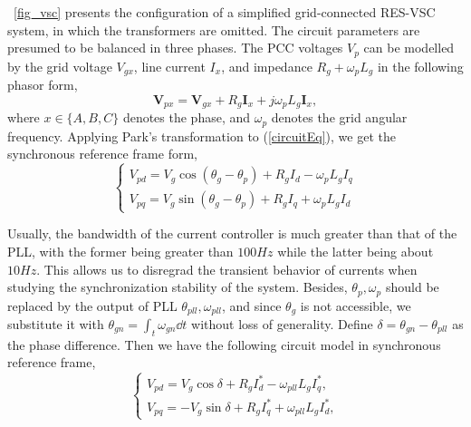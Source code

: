 \documentclass[10pt,final,journal,twoside]{IEEEtran}
\begin{document}
\figurename~\ref{fig_vsc} presents the configuration of a simplified grid-connected RES-VSC system, in which the transformers are omitted. The circuit parameters are presumed to be balanced in three phases.
The PCC voltages $V_p$ can be modelled by the grid voltage $V_{gx}$, line current $I_x$, and impedance $R_g+\omega_pL_g$ in the following phasor form,
\begin{equation}\label{circuitEq}
\bm{V}_{px}=\bm{V}_{gx}+R_g\bm{I}_x+j\omega_pL_g\bm{I}_x,
\end{equation}
where $x\in\{A,B,C\}$ denotes the phase, and $\omega_p$ denotes the grid angular frequency. Applying Park's transformation to (\ref{circuitEq}), we get the synchronous reference frame form,
\begin{equation}\label{circuitdqEq1}
\begin{cases}
    V_{pd}=V_g\cos\left(\theta_g-\theta_p\right)+R_gI_d-\omega_pL_gI_q\\
    V_{pq}=V_g\sin\left(\theta_g-\theta_p\right)+R_gI_q+\omega_pL_gI_d
\end{cases}
\end{equation}\par
Usually, the bandwidth of the current controller is much greater than that of the PLL, with the former being greater than $100Hz$\cite{morris2021} while the latter being about $10Hz$\cite{hu2017}.
This allows us to disregrad the transient behavior of currents when studying the synchronization stability of the system. Besides, $\theta_p,\omega_p$ should be replaced by the output of PLL
$\theta_{pll},\omega_{pll}$, and since $\theta_g$ is not accessible, we substitute it with $\theta_{gn}=\int_t\omega_{gn}\dd t$ without loss of generality. Define $\delta=\theta_{gn}-\theta_{pll}$
as the phase difference. Then we have the following circuit model in synchronous reference frame,
\begin{equation}\label{circuitdqEq2}
\begin{cases}
    V_{pd}=V_g\cos\delta+R_gI_d^*-\omega_{pll}L_gI_q^*,\\
    V_{pq}=-V_g\sin\delta+R_gI_q^*+\omega_{pll}L_gI_d^*,
\end{cases}
\end{equation}
\end{document}
